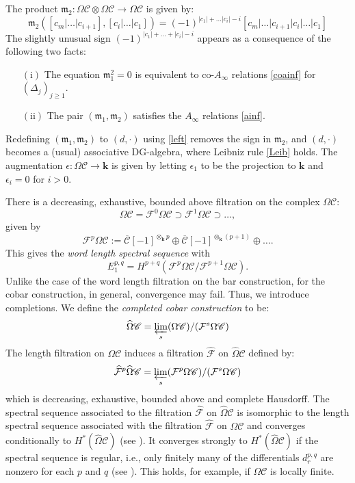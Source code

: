 \documentclass{gtpart}
\renewcommand{\k}{\mathbf{k}}
\newcommand{\m}{\mathfrak{m}}
\newcommand{\Cbar}{\overline{\mathscr{C}}}
\renewcommand{\C}{\mathscr{C}}
\newcommand{\F}{\mathcal{F}}
\begin{document}
    The product $\m_{2} \colon \Omega \C \otimes \Omega \C \to \Omega \C$ is given by:
    \[ \m_2 ([c_m|\ldots |c_{i+1}], [c_{i}|\ldots|c_1]) =
    (-1)^{|c_{1}|+\ldots |c_i|-i} [c_m|\ldots|c_{i+1}|c_{i}|\ldots|c_1] \]
The slightly unusual sign $(-1)^{|c_{1}|+\ldots+|c_i|-i}$ appears as a consequence of the following two facts:
\begin{itemize}
\item[$(\mathrm{i})$]	
The equation $\m_1^2=0$ is equivalent to co-$A_\infty$ relations \eqref{coainf} for
$(\Delta_j)_{j\geq 1}$. 
\item[$(\mathrm{ii})$]
The pair $(\m_1,\m_2)$ satisfies the $A_\infty$ relations \eqref{ainf}. 
\end{itemize} 
Redefining $(\m_1,\m_2)$ to $(d, \cdot) $
using \eqref{left} removes the sign in $\m_2$, and $(d, \cdot)$ becomes a (usual) associative
DG-algebra, where Leibniz rule \eqref{Leib} holds. The augmentation $\epsilon\colon \Omega \C \to \k$ is given by letting $\epsilon_1$ to be the projection
to $\k$ and $\epsilon_i =0$ for $i>0$. 

There is a decreasing, exhaustive, bounded above filtration on the complex     $\Omega \C$:
    \[ \Omega \C = \F^{0}\Omega \C \supset \F^1 \Omega \C \supset \ldots,\]
given by
\[ \F^p \Omega \C := \Cbar[-1]^{\otimes_\k p} \oplus \Cbar[-1]^{\otimes_\k (p+1) }\oplus \ldots. 
\]
This gives the \emph{word length spectral sequence} with
\[ E_1^{p,q} = H^{p+q} (\F^{p} \Omega \C / \F^{p+1} \Omega \C). \]
Unlike the case of the word length filtration on the bar construction, for the cobar construction, in general, convergence may fail. Thus, we introduce
completions. We define the \emph{completed cobar construction} to be: 
\[ \widehat{\Omega} \C = \varprojlim_s (\Omega \C)/ (\F^{s} \Omega \C) \]
The length filtration on $\Omega \C$ induces a filtration $\widehat{\F}$ on $\widehat{\Omega}
\C$ defined by:
\[ \widehat{\F}^p \widehat{\Omega} \C  = \varprojlim_s (\F^{p} \Omega \C) / (\F^{s} \Omega \C) \]
which is decreasing, exhaustive, bounded above and complete Hausdorff. The spectral sequence associated to the filtration $\widehat{\F}$ on $\widehat{\Omega}
\C$
is isomorphic to the length spectral sequence associated with the filtration $\widehat{\F}$ on
$\Omega \C$ and converges conditionally to $H^*(\widehat{\Omega} \C)$ (see \cite[Theorem
9.2]{boardman}). It converges strongly to $H^*(\widehat{\Omega} \C)$ if the spectral sequence is
regular, i.e., only finitely many of the differentials $d_{r}^{p,q}$ are nonzero for each $p$ and $q$
(see \cite[Theorem 7.1]{boardman}). This holds, for example, if $\Omega \C$ is locally finite.  
\end{document}

